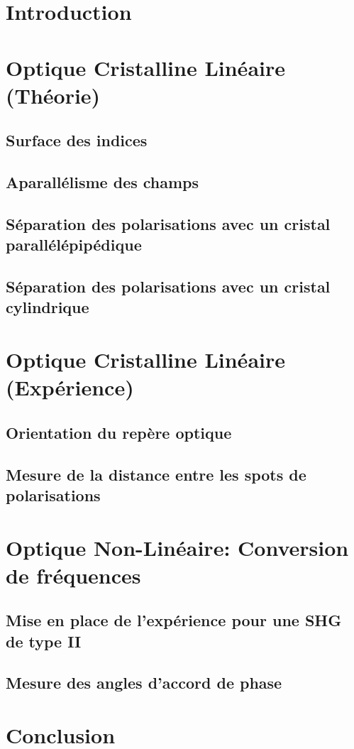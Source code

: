 \documentclass[a4paper,11pt]{report}
\begin{document}

\chapter*{Introduction} 

\chapter{Optique Cristalline Linéaire (Théorie)}
\section{Surface des indices}
\section{Aparallélisme des champs}
\section{Séparation des polarisations avec un cristal parallélépipédique}
\section{Séparation des polarisations avec un cristal cylindrique}

\chapter{Optique Cristalline Linéaire (Expérience)}
\section{Orientation du repère optique}
\section{Mesure de la distance entre les spots de polarisations}

\chapter{Optique Non-Linéaire: Conversion de fréquences}
\section{Mise en place de l'expérience pour une SHG de type II}
\section{Mesure des angles d'accord de phase}

\chapter*{Conclusion} 
\end{document}
